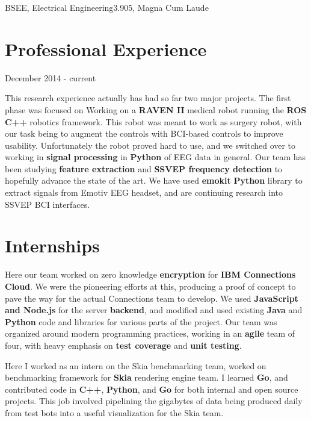 \documentclass{my_resume}
\begin{document}

	{BSEE, Electrical Engineering}{3.905, Magna Cum Laude}

\section{Professional Experience}
	{December 2014 - current}
\begin{flushleft}
This research experience actually has had so far two major projects. The first
phase was focused on Working on a \textbf{RAVEN II} medical robot running the
\textbf{ROS C++} robotics framework. This robot was meant to work as surgery
robot, with our task being to augment the controls with BCI-based controls to
improve usability. Unfortunately the robot proved hard to use, and we switched
over to working in \textbf{signal processing} in \textbf{Python} of EEG data in
general. Our team has been studying \textbf{feature extraction} and
\textbf{SSVEP frequency detection} to hopefully advance the state of the art.
We have used \textbf{emokit} \textbf{Python} library to extract signals from
Emotiv EEG headset, and are continuing research into SSVEP BCI interfaces.
\end{flushleft}
\section{Internships}
\begin{flushleft}
Here our team worked on zero knowledge \textbf{encryption} for 
\textbf{IBM Connections Cloud}. We were the pioneering efforts at this, producing
a proof of concept to pave the way for the actual Connections team to develop.
We used \textbf{JavaScript and Node.js} for the server \textbf{backend}, and
modified and used existing \textbf{Java} and \textbf{Python} code and libraries
for various parts of the project. Our team was organized around modern programming
practices, working in an \textbf{agile} team of four, with heavy emphasis on
\textbf{test coverage} and \textbf{unit testing}.
\end{flushleft}
\begin{flushleft}
Here I worked as an intern on the Skia benchmarking team, worked on benchmarking
framework for \textbf{Skia} rendering engine team. I learned \textbf{Go}, and
contributed code in \textbf{C++}, \textbf{Python}, and \textbf{Go} for both
internal and open source projects. This job involved pipelining the gigabytes
of data being produced daily from test bots into a useful visualization for the
Skia team.
\end{flushleft}
\end{document}
